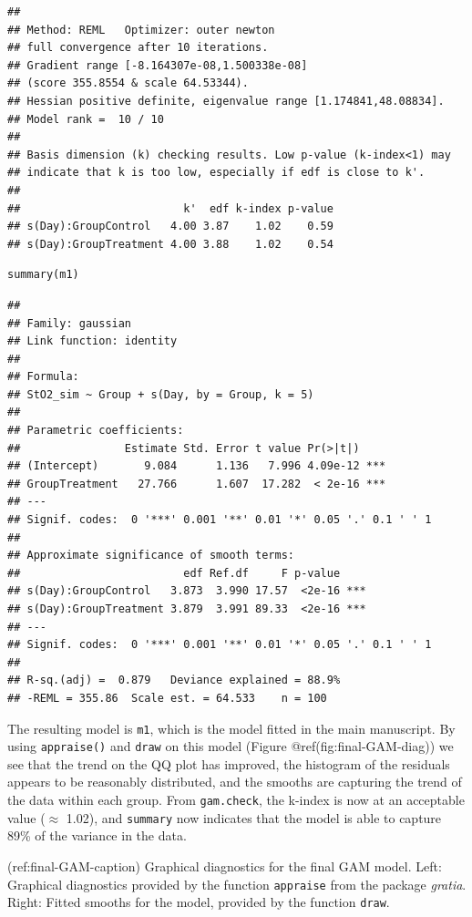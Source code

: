 \documentclass[Royal,times,sagev]{sagej}
\begin{document}
\begin{verbatim}
## 
## Method: REML   Optimizer: outer newton
## full convergence after 10 iterations.
## Gradient range [-8.164307e-08,1.500338e-08]
## (score 355.8554 & scale 64.53344).
## Hessian positive definite, eigenvalue range [1.174841,48.08834].
## Model rank =  10 / 10 
## 
## Basis dimension (k) checking results. Low p-value (k-index<1) may
## indicate that k is too low, especially if edf is close to k'.
## 
##                         k'  edf k-index p-value
## s(Day):GroupControl   4.00 3.87    1.02    0.59
## s(Day):GroupTreatment 4.00 3.88    1.02    0.54
\end{verbatim}

\begin{verbatim}
summary(m1)
\end{verbatim}

\begin{verbatim}
## 
## Family: gaussian 
## Link function: identity 
## 
## Formula:
## StO2_sim ~ Group + s(Day, by = Group, k = 5)
## 
## Parametric coefficients:
##                Estimate Std. Error t value Pr(>|t|)    
## (Intercept)       9.084      1.136   7.996 4.09e-12 ***
## GroupTreatment   27.766      1.607  17.282  < 2e-16 ***
## ---
## Signif. codes:  0 '***' 0.001 '**' 0.01 '*' 0.05 '.' 0.1 ' ' 1
## 
## Approximate significance of smooth terms:
##                         edf Ref.df     F p-value    
## s(Day):GroupControl   3.873  3.990 17.57  <2e-16 ***
## s(Day):GroupTreatment 3.879  3.991 89.33  <2e-16 ***
## ---
## Signif. codes:  0 '***' 0.001 '**' 0.01 '*' 0.05 '.' 0.1 ' ' 1
## 
## R-sq.(adj) =  0.879   Deviance explained = 88.9%
## -REML = 355.86  Scale est. = 64.533    n = 100
\end{verbatim}

The resulting model is \texttt{m1}, which is the model fitted in the
main manuscript. By using \texttt{appraise()} and \texttt{draw} on this
model (Figure @ref(fig:final-GAM-diag)) we see that the trend on the QQ
plot has improved, the histogram of the residuals appears to be
reasonably distributed, and the smooths are capturing the trend of the
data within each group. From \texttt{gam.check}, the k-index is now at
an acceptable value (\(\approx\) 1.02), and \texttt{summary} now
indicates that the model is able to capture 89\% of the variance in the
data.

(ref:final-GAM-caption) Graphical diagnostics for the final GAM model.
Left: Graphical diagnostics provided by the function \texttt{appraise}
from the package \emph{gratia}. Right: Fitted smooths for the model,
provided by the function \texttt{draw}.
\end{document}
